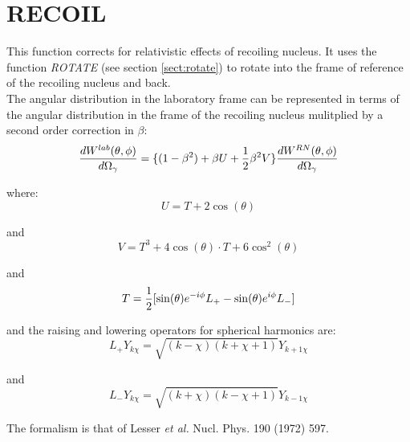 \section{RECOIL}
\label{sect:recoil}

\noindent This function corrects for relativistic effects of recoiling
nucleus. It uses the function {\em ROTATE} (see section \ref{sect:rotate}) to
rotate into the frame of reference of the recoiling nucleus and back.\\

\noindent The angular distribution in the laboratory frame can be represented
in terms of the angular distribution in the frame of the recoiling nucleus
mulitplied by a second order correction in $\beta$:\\

\begin{equation}
{dW^{lab}(\theta, \phi) \over d\Omega_\gamma} = 
\{ (1 - \beta^2) + \beta U + {1 \over 2} \beta^2 V \}
{dW^{RN}(\theta, \phi) \over d\Omega_\gamma}
\end{equation}

\noindent where:\\

\begin{equation}
U = T + 2 \cos(\theta)
\end{equation}

\noindent and\\

\begin{equation}
V = T^3 + 4 \cos(\theta) \cdot T + 6 \cos^2(\theta)
\end{equation}

\noindent and\\

\begin{equation}
T = {1 \over 2} [ \sin(\theta) e^{-i\phi} L_+ - \sin(\theta) e^{i\phi} L_- ]
\end{equation}

\noindent and the raising and lowering operators for spherical harmonics are:\\

\begin{equation}
L_+ Y_{k\chi} = \sqrt{ (k - \chi)(k + \chi + 1)} Y_{k+1 \chi}
\end{equation}

\noindent and\\

\begin{equation}
L_- Y_{k\chi} = \sqrt{ (k + \chi)(k - \chi + 1)} Y_{k-1 \chi}
\end{equation}

\noindent The formalism is that of Lesser {\em et al.} Nucl. Phys. 190 (1972)
597.\\
